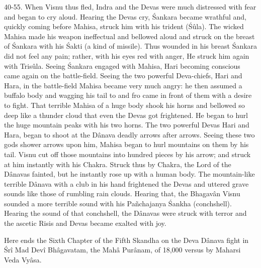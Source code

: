 40-55. When Visnu thus fled, Indra and the Devas were much distressed with fear and began to cry aloud. Hearing the Devas cry, \'Sankara became wrathful and, quickly coming before Mahisa, struck him with his trident (\'S\^ula). The wicked Mahisa made his weapon ineffectual and bellowed aloud and struck on the breast of \'Sankara with his \'Sakti (a kind of missile). Thus wounded in his breast \'Sankara did not feel any pain; rather, with his eyes red with anger, He struck him again with Tris\^ula. Seeing \'Sankara engaged with Mahisa, Hari becoming conscious came again on the battle-field. Seeing the two powerful Deva-chiefs, Hari and Hara, in the battle-field Mahisa became very much angry: he then assumed a buffalo body and wagging his tail to and fro came in front of them with a desire to fight. That terrible Mahisa of a huge body shook his horns and bellowed so deep like a thunder cloud that even the Devas got frightened. He began to hurl the huge mountain peaks with his two horns. The two powerful Devas Hari and Hara, began to shoot at the D\^anava deadly arrows after arrows. Seeing these two gods shower arrows upon him, Mahisa began to hurl mountains on them by his tail. Visnu cut off those mountains into hundred pieces by his arrow; and struck at him instantly with his Chakra. Struck thus by Chakra, the Lord of the D\^anavas fainted, but he instantly rose up with a human body. The mountain-like terrible D\^anava with a club in his hand frightened the Devas and uttered grave sounds like those of rumbling rain clouds. Hearing that, the Bhagav\^an Visnu sounded a more terrible sound with his Pañchajanya \'Sankha (conchshell). Hearing the sound of that conchshell, the D\^anavas were struck with terror and the ascetic Risis and Devas became exalted with joy.

Here ends the Sixth Chapter of the Fifth Skandha on the Deva D\^anava fight in \'Sr\^i Mad Dev\^i Bh\^agavatam, the Mah\^a Pur\^anam, of 18,000 versus by Maharsi Veda Vy\^asa.